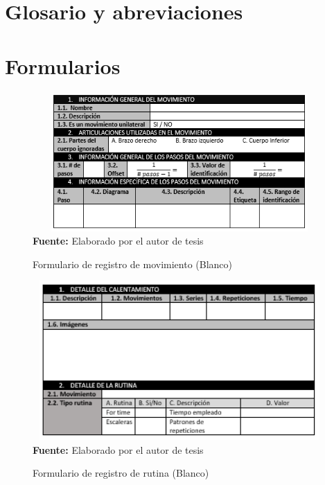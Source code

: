\appendix
\renewcommand{\thesection}{A.\arabic{section}}
\renewcommand{\thesubsection}{A.\arabic{section}.\arabic{subsection}}
\renewcommand{\thesubsubsection}{A.\arabic{section}.\arabic{subsection}.\arabic{subsubsection}}
\renewcommand\thefigure{A.\arabic{section}.\arabic{figure}}   
\renewcommand\thetable{A.\arabic{section}.\arabic{table}}  
\renewcommand\thecode{A.\arabic{section}.\arabic{code}}  
\appendixpage
\addappheadtotoc
\section{Glosario y abreviaciones}
\printglossary
\printglossary[type=\acronymtype, title=Abreviaciones]
\section{Formularios}
\begin{figure}[H]
	\caption{Formulario de  registro de movimiento (Blanco)}
	\label{fig:frmWhiteMov}
	\centering
	\includegraphics[width=430px,height=200px]{graphics/frm-movimiento.PNG} \\
	\textbf{Fuente:} Elaborado por el autor de tesis
\end{figure}

\begin{figure}[H]
	\caption{Formulario de  registro de rutina (Blanco)}
	\label{fig:frmWhiteRout}
	\centering
	\includegraphics[width=430px,height=230px]{graphics/frm-rutina.PNG} \\
	\textbf{Fuente:} Elaborado por el autor de tesis
\end{figure}
